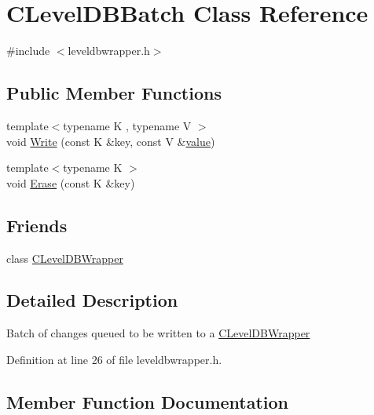 \hypertarget{class_c_level_d_b_batch}{}\section{C\+Level\+D\+B\+Batch Class Reference}
\label{class_c_level_d_b_batch}


{\ttfamily \#include $<$leveldbwrapper.\+h$>$}

\subsection*{Public Member Functions}
\begin{DoxyCompactItemize}
\item 
{\footnotesize template$<$typename K , typename V $>$ }\\void \hyperlink{class_c_level_d_b_batch_ab459da1abafa27e834de9a4cc25b6f2d}{Write} (const K \&key, const V \&\hyperlink{cache_8cc_a0f61d63b009d0880a89c843bd50d8d76}{value})
\item 
{\footnotesize template$<$typename K $>$ }\\void \hyperlink{class_c_level_d_b_batch_a22bf093d560b4ce3333e8f4a947faa7f}{Erase} (const K \&key)
\end{DoxyCompactItemize}
\subsection*{Friends}
\begin{DoxyCompactItemize}
\item 
class \hyperlink{class_c_level_d_b_batch_acbe5e6be88c5bccb0ec229ebc91dde82}{C\+Level\+D\+B\+Wrapper}
\end{DoxyCompactItemize}


\subsection{Detailed Description}
Batch of changes queued to be written to a \hyperlink{class_c_level_d_b_wrapper}{C\+Level\+D\+B\+Wrapper} 

Definition at line 26 of file leveldbwrapper.\+h.



\subsection{Member Function Documentation}
\hypertarget{class_c_level_d_b_batch_a22bf093d560b4ce3333e8f4a947faa7f}{}
